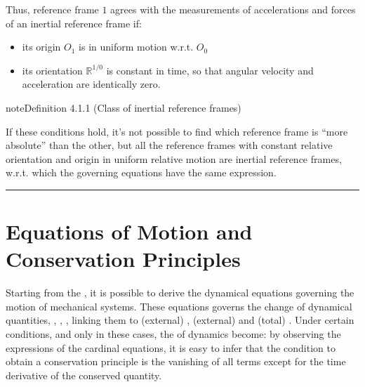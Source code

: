\documentclass[letterpaper,10pt,english]{jupyterBook}
\begin{document}
\sphinxAtStartPar
Thus, reference frame \(1\) agrees with the measurements of accelerations and forces of an inertial reference frame if:
\begin{itemize}
\item {} 
\sphinxAtStartPar
its origin \(O_1\) is in uniform motion w.r.t. \(O_0\)

\item {} 
\sphinxAtStartPar
its orientation \(\mathbb{R}^{1/0}\) is constant in time, so that angular velocity and acceleration are identically zero.

\end{itemize}
\label{ch/dynamics-principles:definition-0}
\begin{sphinxadmonition}{note}{Definition 4.1.1 (Class of inertial reference frames)}



\sphinxAtStartPar
If these conditions hold, it’s not possible to find which reference frame is “more absolute” than the other, but all the reference frames with constant relative orientation and origin in uniform relative motion are inertial reference frames, w.r.t. which the governing equations have the same expression.
\end{sphinxadmonition}


\bigskip\hrule\bigskip


\sphinxstepscope


\section{Equations of Motion and Conservation Principles}
\label{\detokenize{ch/dynamics-eom:equations-of-motion-and-conservation-principles}}\label{\detokenize{ch/dynamics-eom:classical-mechanics-dynamics-eom}}\label{\detokenize{ch/dynamics-eom::doc}}
\sphinxAtStartPar
Starting from the {\hyperref[\detokenize{ch/dynamics-principles:classical-mechanics-dynamics-principles}]{}}, it is possible to derive the dynamical equations governing the motion of mechanical systems. These equations governs the change of dynamical quantities, , , , linking them to (external) , (external)  and (total) . Under certain conditions, and only in these cases, the {\hyperref[\detokenize{ch/dynamics-eom:classical-mechanics-dynamics-eom-eom}]{}} of dynamics become{\hyperref[\detokenize{ch/dynamics-eom:classical-mechanics-dynamics-eom-conservation}]{}}: by observing the expressions of the cardinal equations, it is easy to infer that the condition to obtain a conservation principle is the vanishing of all terms except for the time derivative of the conserved quantity.
\end{document}
